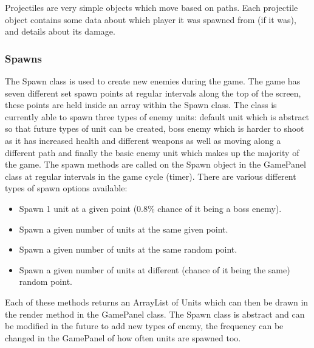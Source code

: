 Projectiles are very simple objects which move based on paths. Each projectile object contains some data about which player it was spawned from (if it was), and details about its damage.
\subsubsection{Spawns}
The Spawn class is used to create new enemies during the game. The game has seven different set spawn points at regular intervals along the top of the screen, these points are held inside an array within the Spawn class. The class is currently able to spawn three types of enemy units: default unit which is abstract so that future types of unit can be created, boss enemy which is harder to shoot as it has increased health and different weapons as well as moving along a different path and finally the basic enemy unit which makes up the majority of the game. The spawn methods are called on the Spawn object in the GamePanel class at regular intervals in the game cycle (timer). There are various different types of spawn options available:
\begin{itemize}
	\item Spawn 1 unit at a given point (0.8\% chance of it being a boss enemy).
	\item Spawn a given number of units at the same given point.
	\item Spawn a given number of units at the same random point.
	\item Spawn a given number of units at different (chance of it being the same) random point.
\end{itemize}
Each of these methods returns an ArrayList of Units which can then be drawn in the render method in the GamePanel class. The Spawn class is abstract and can be modified in the future to add new types of enemy, the frequency can be changed in the GamePanel of how often units are spawned too.

